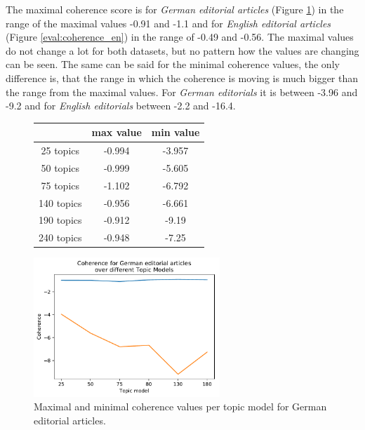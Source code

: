 The maximal coherence score is for \textit{German editorial articles} (Figure \ref{eval:coherence_ger}) in the range of the maximal values -0.91 and -1.1 and for \textit{English editorial articles} (Figure \ref{eval:coherence_en}) in the range of -0.49 and -0.56. The maximal values do not change a lot for both datasets, but no pattern how the values are changing can be seen. The same can be said for the minimal coherence values, the only difference is, that the range in which the coherence is moving is much bigger than the range from the maximal values. For \textit{German editorials} it is between -3.96 and -9.2 and for \textit{English editorials} between -2.2 and -16.4.
\begin{figure}[h]
	\begin{minipage}{0.5\textwidth}
		\centering
		\begin{tabular}[t]{c|cc}
			&max value & min value\\
			\hline
			25 topics&-0.994&-3.957\\
			50 topics&-0.999&-5.605\\
			75 topics&-1.102&-6.792\\
			140 topics&	-0.956&-6.661\\
			190 topics &-0.912&-9.19\\
			240 topics&	-0.948&-7.25\\
		\end{tabular}
	\end{minipage}%
	\begin{minipage}{0.5\textwidth}
		\centering
		\includegraphics[width=7cm]{gfx/Eval_IC/German_Editorial_Coherence.pdf}
	\end{minipage}
	\caption[]{Maximal and minimal coherence values per topic model for German editorial articles.}
	\label{eval:coherence_ger}
\end{figure}

